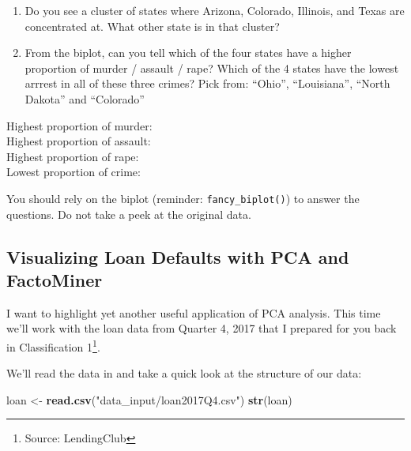 \documentclass[]{article}
\newenvironment{Shaded}{\begin{snugshade}}{\end{snugshade}}
\newcommand{\KeywordTok}[1]{\textcolor[rgb]{0.13,0.29,0.53}{\textbf{#1}}}
\newcommand{\NormalTok}[1]{#1}
\newcommand{\StringTok}[1]{\textcolor[rgb]{0.31,0.60,0.02}{#1}}
\begin{document}
\begin{enumerate}
\def\labelenumi{\arabic{enumi}.}
\item
  Do you see a cluster of states where Arizona, Colorado, Illinois, and
  Texas are concentrated at. What other state is in that cluster?
\item
  From the biplot, can you tell which of the four states have a higher
  proportion of murder / assault / rape? Which of the 4 states have the
  lowest arrrest in all of these three crimes? Pick from: ``Ohio'',
  ``Louisiana'', ``North Dakota'' and ``Colorado''
\end{enumerate}

Highest proportion of murder:\\
Highest proportion of assault:\\
Highest proportion of rape:\\
Lowest proportion of crime:

You should rely on the biplot (reminder: \texttt{fancy\_biplot()}) to
answer the questions. Do not take a peek at the original data.

\hypertarget{visualizing-loan-defaults-with-pca-and-factominer}{%
\subsection{Visualizing Loan Defaults with PCA and
FactoMiner}\label{visualizing-loan-defaults-with-pca-and-factominer}}

I want to highlight yet another useful application of PCA analysis. This
time we'll work with the loan data from Quarter 4, 2017 that I prepared
for you back in Classification 1\footnote{Source: LendingClub}.

We'll read the data in and take a quick look at the structure of our
data:

\begin{Shaded}
\begin{Highlighting}[]
\NormalTok{loan <-}\StringTok{ }\KeywordTok{read.csv}\NormalTok{(}\StringTok{"data_input/loan2017Q4.csv"}\NormalTok{)}
\KeywordTok{str}\NormalTok{(loan)}
\end{Highlighting}
\end{Shaded}
\end{document}
